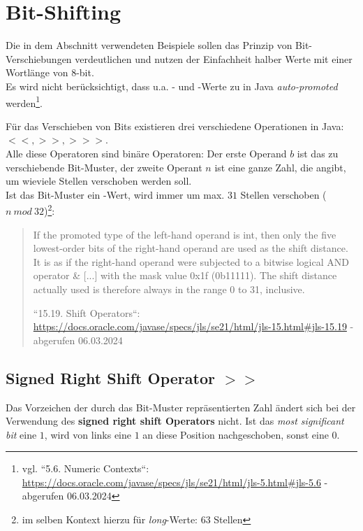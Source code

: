 \section{Bit-Shifting}

\begin{tcolorbox}[colback=red!20,color=white,title={Hinweis}]
    Die in dem Abschnitt verwendeten Beispiele sollen das Prinzip von Bit-Verschiebungen verdeutlichen und nutzen der Einfachheit halber Werte mit einer Wortlänge von 8-bit.\\
    Es wird nicht berücksichtigt, dass u.a. - und -Werte zu  in Java \textit{auto-promoted} werden\footnote{
        vgl. ``5.6. Numeric Contexts``: \url{https://docs.oracle.com/javase/specs/jls/se21/html/jls-5.html#jls-5.6} - abgerufen 06.03.2024
    }.
\end{tcolorbox}

    Für das Verschieben von Bits existieren drei verschiedene Operationen in Java: $<<, >>, >>>$.\\
Alle diese Operatoren sind binäre Operatoren: Der erste Operand $b$ ist das zu verschiebende Bit-Muster, der zweite Operant $n$ ist eine ganze Zahl, die angibt, um wieviele Stellen verschoben werden soll.\\

Ist das Bit-Muster ein -Wert, wird immer um max. $31$ Stellen verschoben ($n\ mod\ 32$)\footnote{im selben Kontext hierzu für \textit{long}-Werte: $63$ Stellen}:

\blockquote[{``15.19. Shift Operators``: \url{https://docs.oracle.com/javase/specs/jls/se21/html/jls-15.html#jls-15.19} - abgerufen 06.03.2024}]{
    If the promoted type of the left-hand operand is int, then only the five lowest-order bits of the right-hand operand are used as the shift distance. It is as if the right-hand operand were subjected to a bitwise logical AND operator & [...] with the mask value 0x1f (0b11111). The shift distance actually used is therefore always in the range 0 to 31, inclusive.
}

\subsection{Signed Right Shift Operator $>>$}

\begin{tcolorbox}
Das Vorzeichen der durch das Bit-Muster repräsentierten Zahl ändert sich bei der Verwendung des \textbf{signed right shift Operators} nicht.
Ist das \textit{most significant bit} eine $1$, wird von links eine $1$ an diese Position nachgeschoben, sonst eine $0$.\\
\end{tcolorbox}

